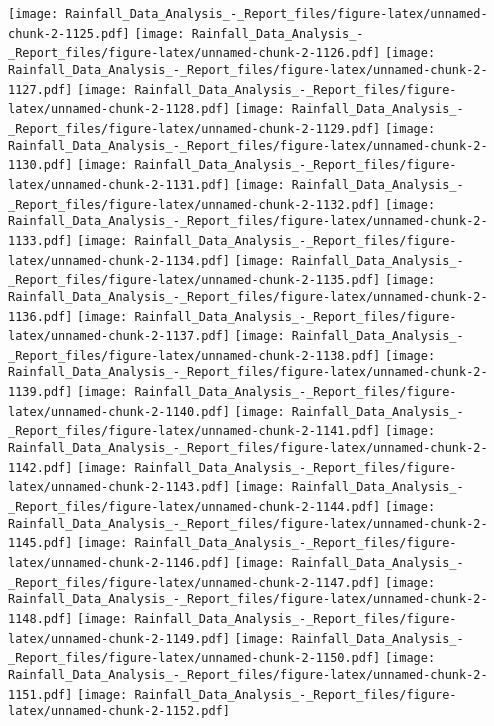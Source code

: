 \documentclass[
]{article}
\begin{document}
\texttt{[image: Rainfall\_Data\_Analysis\_-\_Report\_files/figure-latex/unnamed-chunk-2-1125.pdf]}
\texttt{[image: Rainfall\_Data\_Analysis\_-\_Report\_files/figure-latex/unnamed-chunk-2-1126.pdf]}
\texttt{[image: Rainfall\_Data\_Analysis\_-\_Report\_files/figure-latex/unnamed-chunk-2-1127.pdf]}
\texttt{[image: Rainfall\_Data\_Analysis\_-\_Report\_files/figure-latex/unnamed-chunk-2-1128.pdf]}
\texttt{[image: Rainfall\_Data\_Analysis\_-\_Report\_files/figure-latex/unnamed-chunk-2-1129.pdf]}
\texttt{[image: Rainfall\_Data\_Analysis\_-\_Report\_files/figure-latex/unnamed-chunk-2-1130.pdf]}
\texttt{[image: Rainfall\_Data\_Analysis\_-\_Report\_files/figure-latex/unnamed-chunk-2-1131.pdf]}
\texttt{[image: Rainfall\_Data\_Analysis\_-\_Report\_files/figure-latex/unnamed-chunk-2-1132.pdf]}
\texttt{[image: Rainfall\_Data\_Analysis\_-\_Report\_files/figure-latex/unnamed-chunk-2-1133.pdf]}
\texttt{[image: Rainfall\_Data\_Analysis\_-\_Report\_files/figure-latex/unnamed-chunk-2-1134.pdf]}
\texttt{[image: Rainfall\_Data\_Analysis\_-\_Report\_files/figure-latex/unnamed-chunk-2-1135.pdf]}
\texttt{[image: Rainfall\_Data\_Analysis\_-\_Report\_files/figure-latex/unnamed-chunk-2-1136.pdf]}
\texttt{[image: Rainfall\_Data\_Analysis\_-\_Report\_files/figure-latex/unnamed-chunk-2-1137.pdf]}
\texttt{[image: Rainfall\_Data\_Analysis\_-\_Report\_files/figure-latex/unnamed-chunk-2-1138.pdf]}
\texttt{[image: Rainfall\_Data\_Analysis\_-\_Report\_files/figure-latex/unnamed-chunk-2-1139.pdf]}
\texttt{[image: Rainfall\_Data\_Analysis\_-\_Report\_files/figure-latex/unnamed-chunk-2-1140.pdf]}
\texttt{[image: Rainfall\_Data\_Analysis\_-\_Report\_files/figure-latex/unnamed-chunk-2-1141.pdf]}
\texttt{[image: Rainfall\_Data\_Analysis\_-\_Report\_files/figure-latex/unnamed-chunk-2-1142.pdf]}
\texttt{[image: Rainfall\_Data\_Analysis\_-\_Report\_files/figure-latex/unnamed-chunk-2-1143.pdf]}
\texttt{[image: Rainfall\_Data\_Analysis\_-\_Report\_files/figure-latex/unnamed-chunk-2-1144.pdf]}
\texttt{[image: Rainfall\_Data\_Analysis\_-\_Report\_files/figure-latex/unnamed-chunk-2-1145.pdf]}
\texttt{[image: Rainfall\_Data\_Analysis\_-\_Report\_files/figure-latex/unnamed-chunk-2-1146.pdf]}
\texttt{[image: Rainfall\_Data\_Analysis\_-\_Report\_files/figure-latex/unnamed-chunk-2-1147.pdf]}
\texttt{[image: Rainfall\_Data\_Analysis\_-\_Report\_files/figure-latex/unnamed-chunk-2-1148.pdf]}
\texttt{[image: Rainfall\_Data\_Analysis\_-\_Report\_files/figure-latex/unnamed-chunk-2-1149.pdf]}
\texttt{[image: Rainfall\_Data\_Analysis\_-\_Report\_files/figure-latex/unnamed-chunk-2-1150.pdf]}
\texttt{[image: Rainfall\_Data\_Analysis\_-\_Report\_files/figure-latex/unnamed-chunk-2-1151.pdf]}
\texttt{[image: Rainfall\_Data\_Analysis\_-\_Report\_files/figure-latex/unnamed-chunk-2-1152.pdf]}
\end{document}
